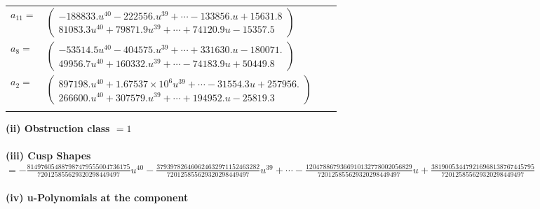 \documentclass[1p]{elsarticle_modified}
\theoremstyle{definition}
\begin{document}
\begin{tabular}{m{7pt} m{180pt} m{7pt} m{180pt} }
\flushright $a_{11}=$&$\begin{pmatrix}-188833. u^{40}-222556. u^{39}+\cdots-133856. u+15631.8\\81083.3 u^{40}+79871.9 u^{39}+\cdots+74120.9 u-15357.5\end{pmatrix}$ \\
\flushright $a_{8}=$&$\begin{pmatrix}-53514.5 u^{40}-404575. u^{39}+\cdots+331630. u-180071.\\49956.7 u^{40}+160332. u^{39}+\cdots-74183.9 u+50449.8\end{pmatrix}$ \\
\flushright $a_{2}=$&$\begin{pmatrix}897198. u^{40}+1.67537\times10^{6} u^{39}+\cdots-31554.3 u+257956.\\266600. u^{40}+307579. u^{39}+\cdots+194952. u-25819.3\end{pmatrix}$\\&\end{tabular}
\flushleft \textbf{(ii) Obstruction class $= 1$}\\~\\
\flushleft \textbf{(iii) Cusp Shapes $= -\frac{814976054887987479555004736175}{720125855629320298449497} u^{40}-\frac{379397826460624632971152463282}{720125855629320298449497} u^{39}+\cdots-\frac{1204788679366910132778002056829}{720125855629320298449497} u+\frac{381900534479216968138767445795}{720125855629320298449497}$}\\~\\
\newpage\renewcommand{\arraystretch}{1}
\flushleft \textbf{(iv) u-Polynomials at the component}\newline \\
\end{document}
